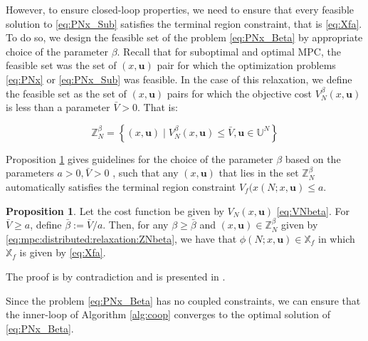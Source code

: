 \documentclass[10pt]{article}
\newcommand{\bu}{\mathbf{u}}
\newcommand{\set}[1]{\left\lbrace #1 \right\rbrace}
\theoremstyle{definition}
\newtheorem{proposition}[assumption]{Proposition}
\begin{document}
However, to ensure closed-loop properties, we need to ensure that every feasible solution to \eqref{eq:PNx_Sub} satisfies the terminal region constraint, that is \eqref{eq:Xfa}. To do so, we design the feasible set of the problem \eqref{eq:PNx_Beta} by appropriate choice of the parameter $\beta$. Recall that for suboptimal and optimal MPC, the feasible set was the set of $(x,\bu)$ pair for which the optimization problems \eqref{eq:PNx} or \eqref{eq:PNx_Sub} was feasible.  In the case of this relaxation, we define the feasible set as the set of $(x,\bu)$ pairs for which the objective cost $V_N^\beta(x,\bu)$ is less than a parameter $\bar{V}>0$. That is:

\begin{equation}
\label{eq:mpc:distributed:relaxation:ZNbeta}
\mathbb{Z}_N^\beta= \set{ (x,\bu) \mid V_N^\beta(x,\bu) \leq \bar{V}, \bu \in
  \mathbb{U}^N}
\end{equation}


Proposition \ref{prop:betabar} gives guidelines for the choice of the parameter $\beta$ based on the parameters $a>0, \bar{V}>0$ , such that any $(x,\bu)$ that lies in the set $\mathbb{Z}_N^\beta$ automatically satisfies the terminal region constraint $V_f(x(N;x,\bu)\leq a$. 

\begin{proposition}
\label{prop:betabar}
Let the cost function be given by $V_N(x,\bu)$ \eqref{eq:VNbeta}. For  $\bar{V}
\geq a $, define $\bar{\beta} := \bar{V}/a$. Then, for any $\beta \geq
\bar{\beta}$ and $(x,\bu) \in \mathbb{Z}_N^\beta$ given by \eqref{eq:mpc:distributed:relaxation:ZNbeta}, we have
that $\phi(N;x,\bu) \in \mathbb{X}_f$ in which $\mathbb{X}_f$ is given
by \eqref{eq:Xfa}. 
\end{proposition}
The proof is by contradiction and is presented in
\citet{subramanian:rawlings:maravelias:2012}.

Since the problem \eqref{eq:PNx_Beta} has no coupled constraints, we
can ensure that the inner-loop of Algorithm \ref{alg:coop} converges
to the optimal solution of \eqref{eq:PNx_Beta}.
  
\end{document}
